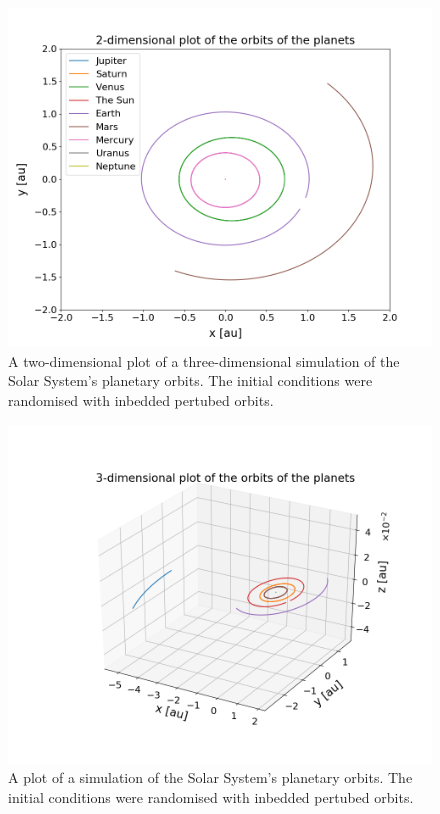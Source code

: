 \documentclass[reprint,english]{revtex4-1}
\begin{document}
\begin{figure}[]
\centering
\includegraphics[scale=0.3]{../output/solar_system/solar_system_2d.png}
\caption{A two-dimensional plot of a three-dimensional simulation of the Solar System's planetary orbits. The initial conditions were randomised with inbedded pertubed orbits.}\label{fig:solar_system_2d}
\end{figure}

\begin{figure}[]
\centering
\includegraphics[scale=0.37]{../output/solar_system/solar_system_3d.png}
\caption{A plot of a simulation of the Solar System's planetary orbits. The initial conditions were randomised with inbedded pertubed orbits.}\label{fig:solar_system_3d}
\end{figure}
\end{document}
